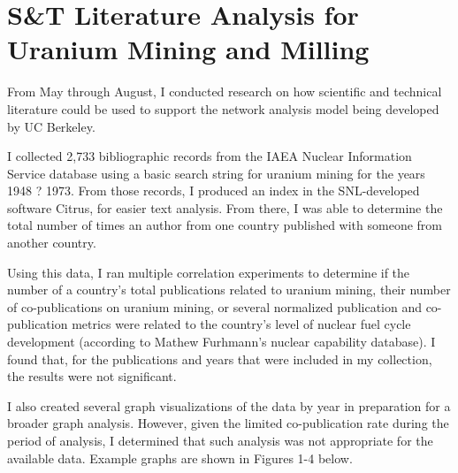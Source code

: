 \documentclass{article} %
\begin{document}
\section*{S\&T Literature Analysis for Uranium Mining and Milling}
From May through August, I conducted research on how scientific and technical literature could be used to support the network analysis model being developed by UC Berkeley. 

I collected 2,733 bibliographic records from the IAEA Nuclear Information Service database using a basic search string for uranium mining for the years 1948 ? 1973.  From those records, I produced an index in the SNL-developed software Citrus, for easier text analysis. From there, I was able to determine the total number of times an author from one country published with someone from another country. 

Using this data, I ran multiple correlation experiments to determine if the number of a country's total publications related to uranium mining, their number of co-publications on uranium mining, or several normalized publication and co-publication metrics were related to the country's level of nuclear fuel cycle development (according to Mathew Furhmann's nuclear capability database). I found that, for the publications and years that were included in my collection, the results were not significant. 

I also created several graph visualizations of the data by year in preparation for a broader graph analysis. However, given the limited co-publication rate during the period of analysis, I determined that such analysis was not appropriate for the available data. Example graphs are shown in Figures 1-4 below.
\end{document}
